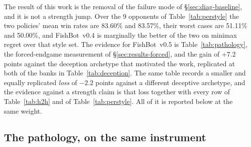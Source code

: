 \documentclass[11pt]{article}
\theoremstyle{definition}
\DeclareRobustCommand{\vfive}{\texorpdfstring{\mbox{FishBot v0.5}}{FishBot v0.5}}
\DeclareRobustCommand{\vfour}{\texorpdfstring{\mbox{FishBot v0.4}}{FishBot v0.4}}
\providecommand{\numVfiveMean}{83.60}
\providecommand{\numVfourMean}{83.57}
\providecommand{\numVfiveWorst}{51.11}
\providecommand{\numVfourWorst}{50.00}
\providecommand{\numDecFeintDelta}{-2.2}
\providecommand{\numDecWithholderDelta}{+7.2}
\providecommand{\numVfiveStyleN}{9}
\begin{document}
The result of this work is the removal of the failure mode of
\S\ref{sec:diag-baseline}, and it is not a strength jump. Over the
\numVfiveStyleN{} opponents of Table~\ref{tab:perstyle} the two policies' mean
win rates are \numVfiveMean\% and \numVfourMean\%, their worst cases are
\numVfiveWorst\% and \numVfourWorst\%, and \vfour{} is marginally the better of
the two on minimax regret over that style set. The evidence for \vfive{} is
Table~\ref{tab:pathology}, the forced-endgame measurement of
\S\ref{sec:results-forced}, and the gain of $\numDecWithholderDelta$ points
against the deception archetype that motivated the work, replicated at both of
the banks in Table~\ref{tab:deception}. The same table records a smaller and
equally replicated \emph{loss} of $\numDecFeintDelta$ points against a different
deceptive archetype, and the evidence against a strength claim is that loss
together with every row of Table~\ref{tab:h2h} and of Table~\ref{tab:perstyle}.
All of it is reported below at the same weight.

\subsection{The pathology, on the same instrument}
\label{sec:results-pathology}
\end{document}
